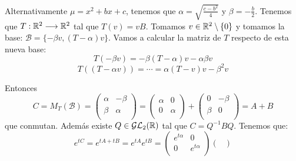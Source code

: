 \begin{ejemplo}
                         Alternativamente \(\mu=x^2+bx+c\), tenemos que
                         \(\alpha=\sqrt{\frac{c-b^2}{4}}\) y \(\beta=-\frac{b}{2}\).
                         Tenemos que \(T:\mathbb{R}^2 \longrightarrow\mathbb{R}^2\) tal que \(T(v)=vB\).
                         Tomamos \(v\in\mathbb{R}^2\setminus\{0\}\) y tomamos la base:
                         \(\mathcal{B}=\{-\beta v,{(T-\alpha)}v\}\).
                         Vamos a calcular la matriz de \(T\)
                         respecto de esta nueva base:
                         \[
                           T(-\beta v)=-\beta{(T-\alpha)}v-\alpha\beta v
                         \]
                         \[
                           T((T-\alpha v))=\cdots=\alpha{(T-v)}v-\beta^2 v
                         \]

                         Entonces
                         \[
                           C=M_T(\mathcal{B})=
                           \begin{pmatrix}
                             \alpha&-\beta\\
                             \beta&\alpha\\
                           \end{pmatrix}=
                           \begin{pmatrix}
                             \alpha&0\\
                             0&\alpha\\
                           \end{pmatrix}+
                           \begin{pmatrix}
                             0&-\beta\\
                             \beta&0\\
                           \end{pmatrix}
                           =A+B
                         \]
                         que conmutan. Además
                         existe \(Q\in\mathcal{GL}_2(\mathbb{R})\) tal que \(C=Q^{-1}BQ\). Tenemos que:
                         \[
                           e^{tC}=e^{tA+tB}=e^{tA}e^{tB}=
                           \begin{pmatrix}
                             e^{t\alpha}&0\\
                             0&e^{t\alpha}\\
                           \end{pmatrix}
                           \begin{pmatrix}

\end{pmatrix}\]
\end{ejemplo}
